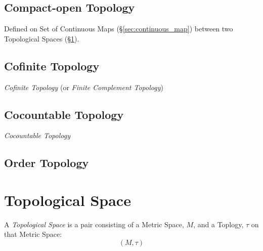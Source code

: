\subsection{Compact-open Topology}\label{sec:compact_open}

Defined on Set of Continuous Maps (\S\ref{sec:continuous_map}) between
two Topological Spaces (\S\ref{sec:topological_space}).



\subsection{Cofinite Topology}\label{sec:cofinite_topology}

\emph{Cofinite Topology} (or \emph{Finite Complement Topology})



\subsection{Cocountable Topology}\label{sec:cocountable_topology}

\emph{Cocountable Topology}



\subsection{Order Topology}\label{sec:order_topology}



\section{Topological Space}\label{sec:topological_space}

A \emph{Topological Space} is a pair consisting of a Metric Space,
$M$, and a Toplogy, $\tau$ on that Metric Space:
\[
  (M,\tau)
\]

